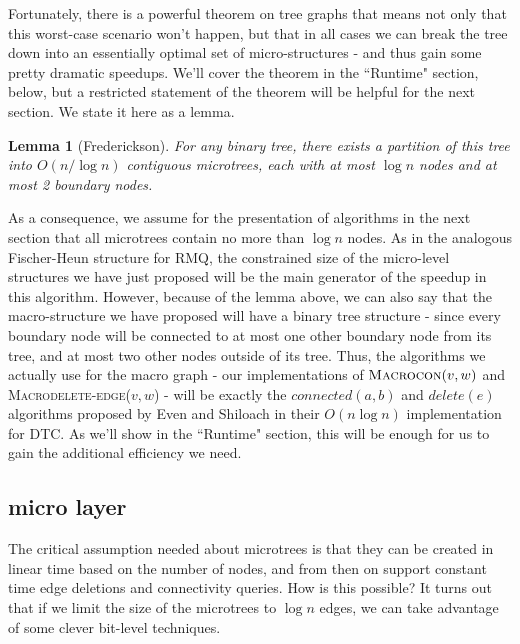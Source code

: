 \documentclass{article}
\newtheorem*{lemma*}{Lemma}
\begin{document}
Fortunately, there is a powerful theorem on tree graphs that means not only that this worst-case scenario won't happen, but that in all cases we can break the tree down into an essentially optimal set of micro-structures - and thus gain some pretty dramatic speedups. We'll cover the theorem in the ``Runtime" section, below, but a restricted statement of the theorem will be helpful for the next section. We state it here as a lemma.

\begin{lemma*}[Frederickson]
    For any binary tree, there exists a partition of this tree into $O(n/\log n)$ contiguous microtrees, each with at most $\log n$ nodes and at most 2 boundary nodes.
\end{lemma*}

As a consequence, we assume for the presentation of algorithms in the next section that all microtrees contain no more than $\log n$ nodes. As in the analogous Fischer-Heun structure for RMQ, the constrained size of the micro-level structures we have just proposed will be the main generator of the speedup in this algorithm. However, because of the lemma above, we can also say that the macro-structure we have proposed will have a binary tree structure - since every boundary node will be connected to at most one other boundary node from its tree, and at most two other nodes outside of its tree. Thus, the algorithms we actually use for the macro graph - our implementations of $\textsc{Macrocon}(v,w)$ and \textsc{Macrodelete-edge}($v,w$) - will be exactly the $connected(a,b)$ and $delete(e)$ algorithms proposed by Even and Shiloach in their $O(n\log n)$ implementation for DTC. As we'll show in the ``Runtime" section, this will be enough for us to gain the additional efficiency we need.

\subsection{micro layer}
The critical assumption needed about microtrees is that they can be created in linear time based on the number of nodes, and from then on support constant time edge deletions and connectivity queries.  How is this possible?  It turns out that if we limit the size of the microtrees to $\log n$ edges, we can take advantage of some clever bit-level techniques.
\end{document}
